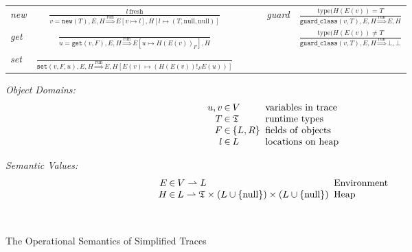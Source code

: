 \documentclass{sigplanconf}
\begin{document}
\begin{figure}
\begin{center}
\begin{tabular}{lcccc}
\emph{new} & ${\displaystyle \frac{l\,\mathrm{fresh}}{v=\mathtt{new}(T),E,H\overset{\mathrm{run}}{\Longrightarrow}E\left[v\mapsto l\right],H\left[l\mapsto\left(T,\mathrm{null},\mathrm{null}\right)\right]}}$ & ~~~ & \emph{guard} & ${\displaystyle \frac{\mathrm{type}(H(E(v))=T}{\mathtt{guard\_class}(v,T),E,H\overset{\mathrm{run}}{\Longrightarrow}E,H}}$\tabularnewline[3em]
\emph{get} & ${\displaystyle \frac{\,}{u=\mathtt{get}(v,F),E,H\overset{\mathrm{run}}{\Longrightarrow}E\left[u\mapsto H\left(E\left(v\right)\right)_{F}\right],H}}$ & ~~~ &  & ${\displaystyle \frac{\mathrm{type}(H(E(v))\neq T}{\mathtt{guard\_class}(v,T),E,H\overset{\mathrm{run}}{\Longrightarrow}\bot,\bot}}$\tabularnewline[3em]
\emph{set} & ${\displaystyle \frac{\,}{\mathtt{set}\left(v,F,u\right),E,H\overset{\mathrm{run}}{\Longrightarrow}E,H\left[E\left(v\right)\mapsto\left(H\left(E\left(v\right)\right)!_{F}E(u)\right)\right]}}$ & ~~~ &  & \tabularnewline[4em]
\end{tabular}
\end{center}

\begin{minipage}[b]{7 cm}
\emph{Object Domains:}
$$\setlength\arraycolsep{0.1em}
 \begin{array}{rcll}
    u,v & \in & V & \mathrm{\ variables\ in\ trace}\\
    T & \in & \mathfrak{T} & \mathrm{\ runtime\ types}\\
    F & \in & \left\{ L,R\right\} & \mathrm{\ fields\ of\ objects}\\
    l & \in & L & \mathrm{\ locations\ on\ heap}
 \end{array}
$$
\end{minipage}
\begin{minipage}[b]{5 cm}
\emph{Semantic Values:}
$$\setlength\arraycolsep{0.1em}
 \begin{array}{rcll}
    E & \in & V\rightharpoonup L & \mathrm{\ Environment}\\
    H & \in & L\rightharpoonup\mathfrak{T}\times(L\cup \{ \mathrm{null} \})\times (L\cup \{ \mathrm{null}\} ) & \mathrm{\ Heap}\\
    \\
    \\
 \end{array}
$$
\end{minipage}
\caption{The Operational Semantics of Simplified Traces}
\label{fig:semantics}
\end{figure}
\end{document}
